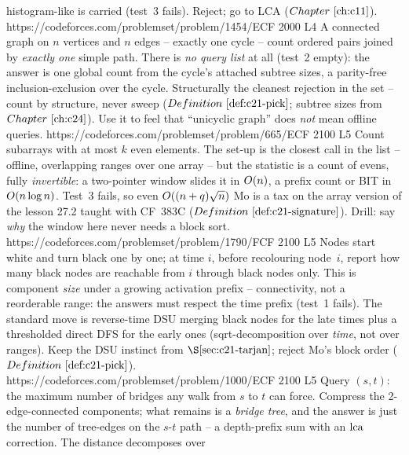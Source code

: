 \begin{mixedset}
{     histogram-like is carried (test~3 fails). Reject; go to LCA (\(\chref{c11}\)).}
    {https://codeforces.com/problemset/problem/1454/E}{CF 2000 L4}
    {A connected graph on \(n\) vertices and \(n\) edges -- exactly one cycle -- count
     ordered pairs joined by \emph{exactly one} simple path. There is \emph{no query
     list} at all (test~2 empty): the answer is one global count from the cycle's
     attached subtree sizes, a parity-free inclusion-exclusion over the cycle.
     Structurally the cleanest rejection in the set -- count by structure, never sweep
     (\(\defref{c21-pick}\); subtree sizes from \(\chref{c24}\)). Use it to feel that
     ``unicyclic graph'' does \emph{not} mean offline queries.}
    {https://codeforces.com/problemset/problem/665/E}{CF 2100 L5}
    {Count subarrays with at most \(k\) even elements. The set-up is the closest call in
     the list -- offline, overlapping ranges over one array -- but the statistic is a
     count of evens, fully \emph{invertible}: a two-pointer window slides it in
     \(O(n)\), a prefix count or BIT in \(O(n\log n)\). Test~3 fails, so even
     \(O((n+q)\sqrt n)\) Mo is a tax on the array version of the lesson 27.2 taught
     with CF~383C (\(\defref{c21-signature}\)). Drill: say \emph{why} the window here
     never needs a block sort.}
    {https://codeforces.com/problemset/problem/1790/F}{CF 2100 L5}
    {Nodes start white and turn black one by one; at time \(i\), before recolouring
     node~\(i\), report how many black nodes are reachable from \(i\) through black
     nodes only. This is component \emph{size} under a growing activation prefix --
     connectivity, not a reorderable range: the answers must respect the time prefix
     (test~1 fails). The standard move is reverse-time DSU merging black nodes for the
     late times plus a thresholded direct DFS for the early ones (sqrt-decomposition
     over \emph{time}, not over ranges). Keep the DSU instinct from
     \(\secref{c21-tarjan}\); reject Mo's block order (\(\defref{c21-pick}\)).}
    {https://codeforces.com/problemset/problem/1000/E}{CF 2100 L5}
    {Query \((s,t)\): the maximum number of bridges any walk from \(s\) to \(t\) can
     force. Compress the 2-edge-connected components; what remains is a \emph{bridge
     tree}, and the answer is just the number of tree-edges on the \(s\)-\(t\) path --
     a depth-prefix sum with an \(\operatorname{lca}\) correction. The distance decomposes over
}
\end{mixedset}
